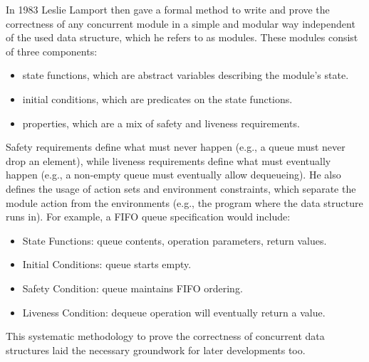 In 1983 Leslie Lamport then gave a formal method to write and prove the correctness of any concurrent module in a simple and modular way independent of the used data structure, which he refers to as modules. These modules consist of three components: 
\begin{itemize}
   \item state functions, which are abstract variables describing the module's state.
   \item initial conditions, which are predicates on the state functions.
   \item properties, which are a mix of safety and liveness requirements.
\end{itemize}
Safety requirements define what must never happen (e.g., a queue must never drop an element), while liveness requirements define what must eventually happen (e.g., a non-empty queue must eventually allow dequeueing). He also defines the usage of action sets and environment constraints, which separate the module action from the environments (e.g., the program where the data structure runs in). For example, a \ac{FIFO} queue specification would include:
\begin{itemize}
   \item State Functions: queue contents, operation parameters, return values.
   \item Initial Conditions: queue starts empty.
   \item Safety Condition: queue maintains \ac{FIFO} ordering.
   \item Liveness Condition: dequeue operation will eventually return a value.
\end{itemize}
This systematic methodology to prove the correctness of concurrent data structures laid the necessary groundwork for later developments too. \cite{Lamport1983SPSCCircularBuffer}

